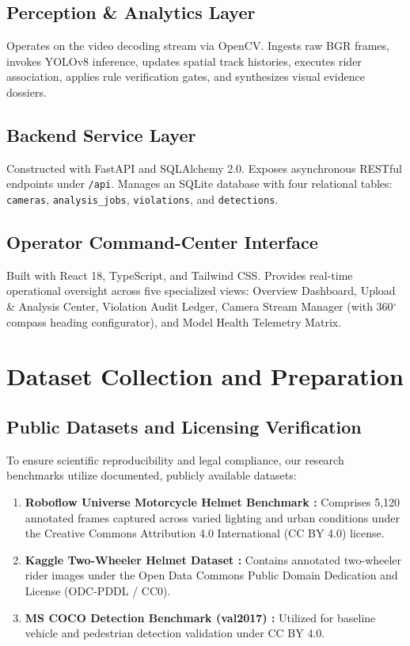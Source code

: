 \documentclass[conference]{IEEEtran}
\begin{document}
\subsection{Perception \& Analytics Layer}
Operates on the video decoding stream via OpenCV. Ingests raw BGR frames, invokes YOLOv8 inference, updates spatial track histories, executes rider association, applies rule verification gates, and synthesizes visual evidence dossiers.

\subsection{Backend Service Layer}
Constructed with FastAPI and SQLAlchemy 2.0. Exposes asynchronous RESTful endpoints under \texttt{/api}. Manages an SQLite database with four relational tables: \texttt{cameras}, \texttt{analysis\_jobs}, \texttt{violations}, and \texttt{detections}.

\subsection{Operator Command-Center Interface}
Built with React 18, TypeScript, and Tailwind CSS. Provides real-time operational oversight across five specialized views: Overview Dashboard, Upload \& Analysis Center, Violation Audit Ledger, Camera Stream Manager (with 360$^\circ$ compass heading configurator), and Model Health Telemetry Matrix.

\section{Dataset Collection and Preparation}

\subsection{Public Datasets and Licensing Verification}
To ensure scientific reproducibility and legal compliance, our research benchmarks utilize documented, publicly available datasets:
\begin{enumerate}
    \item \textbf{Roboflow Universe Motorcycle Helmet Benchmark \cite{traore2023roboflow}:} Comprises 5,120 annotated frames captured across varied lighting and urban conditions under the Creative Commons Attribution 4.0 International (CC BY 4.0) license.
    \item \textbf{Kaggle Two-Wheeler Helmet Dataset \cite{kaggle2021helmet}:} Contains annotated two-wheeler rider images under the Open Data Commons Public Domain Dedication and License (ODC-PDDL / CC0).
    \item \textbf{MS COCO Detection Benchmark (val2017) \cite{lin2014microsoft}:} Utilized for baseline vehicle and pedestrian detection validation under CC BY 4.0.
\end{enumerate}
\end{document}

